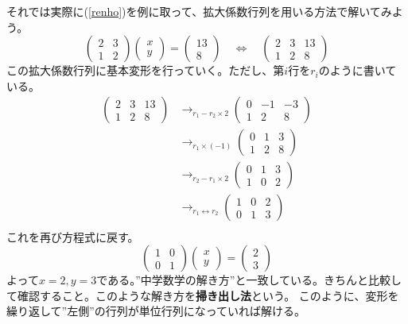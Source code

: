 \documentclass[10pt]{jsreport}
\theoremstyle{definition}%
\newcommand{\kakko}[1]{\left(#1 \right)} %
\numberwithin{equation}{section}%
\begin{document}
それでは実際に(\ref{renho})を例に取って、拡大係数行列を用いる方法で解いてみよう。
\begin{equation}
  \kakko{\begin{matrix}
    2 & 3\\
    1 & 2
  \end{matrix}}
  \kakko{\begin{matrix}
    x\\
    y
  \end{matrix}}
  =
  \kakko{\begin{matrix}
    13\\
    8
  \end{matrix}}\quad \Leftrightarrow \quad 
  \kakko{\begin{array}{cc|c} 
    2 & 3  & 13 \\ 
   1 & 2 & 8
  \end{array}}
\end{equation}
この拡大係数行列に基本変形を行っていく。ただし、第$i$行を$r_{i}$のように書いている。
\begin{align}
  \kakko{\begin{array}{cc|c} 
    2 & 3  & 13 \\ 
   1 & 2 & 8
  \end{array}}&\to_{r_{1}-r_{2}\times 2} 
  \kakko{\begin{array}{cc|c} 
    0 & -1  & -3 \\ 
   1 & 2 & 8
  \end{array}}\\
  &\to_{r_{1}\times(-1)}
  \kakko{\begin{array}{cc|c} 
    0 & 1  & 3 \\ 
   1 & 2 & 8
  \end{array}}\\
  &\to_{r_{2}-r_{1}\times 2}
  \kakko{\begin{array}{cc|c} 
    0 & 1  & 3 \\ 
   1 & 0 & 2
  \end{array}}\\
  &\to_{r_{1}\leftrightarrow r_{2}}
  \kakko{\begin{array}{cc|c}  
   1 & 0 & 2\\
   0 & 1  & 3 
  \end{array}}\\
\end{align}
これを再び方程式に戻す。
\begin{equation}
  \kakko{\begin{matrix}
    1 & 0\\
    0 & 1
  \end{matrix}}
  \kakko{\begin{matrix}
    x\\
    y
  \end{matrix}}
  =
  \kakko{\begin{matrix}
    2\\
    3
  \end{matrix}}
\end{equation}
よって\underline{$x=2,y=3$}である。''中学数学の解き方''と一致している。きちんと比較して確認すること。このような解き方を{\bf 掃き出し法}という。
このように、変形を繰り返して''左側''の行列が単位行列になっていれば解ける。
\end{document}

